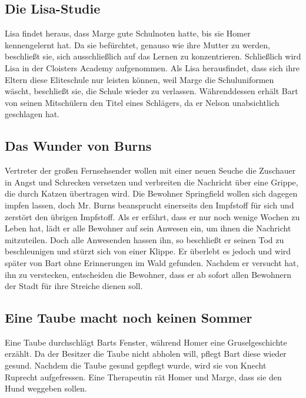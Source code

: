 \subsection{Die Lisa-Studie}
Lisa findet heraus, dass Marge gute Schulnoten hatte, bis sie Homer kennengelernt hat. Da sie befürchtet, genauso wie ihre Mutter zu werden, beschließt sie, sich ausschließlich auf das Lernen zu konzentrieren. Schließlich wird Lisa in der Cloisters Academy aufgenommen. Als Lisa herausfindet, dass sich ihre Eltern diese Eliteschule nur leisten können, weil Marge die Schuluniformen wäscht, beschließt sie, die Schule wieder zu verlassen. Währenddessen erhält Bart von seinen Mitschülern den Titel eines Schlägers, da er Nelson unabsichtlich geschlagen hat.


\subsection{Das Wunder von Burns}\label{NABF01}
Vertreter der großen Fernsehsender wollen mit einer neuen Seuche die Zuschauer in Angst und Schrecken versetzen und verbreiten die Nachricht über eine Grippe, die durch Katzen übertragen wird. Die Bewohner Springfield wollen sich dagegen impfen lassen, doch Mr. Burns beansprucht einerseits den Impfstoff für sich und zerstört den übrigen Impfstoff. Als er erfährt, dass er nur noch wenige Wochen zu Leben hat, lädt er alle Bewohner auf sein Anwesen ein, um ihnen die Nachricht mitzuteilen. Doch alle Anwesenden hassen ihn, so beschließt er seinen Tod zu beschleunigen und stürzt sich von einer Klippe. Er überlebt es jedoch und wird später von Bart ohne Erinnerungen im Wald gefunden. Nachdem er versucht hat, ihn zu verstecken, entscheiden die Bewohner, dass er ab sofort allen Bewohnern der Stadt für ihre Streiche dienen soll. 


\subsection{Eine Taube macht noch keinen Sommer}\label{NABF02}
Eine Taube durchschlägt Barts Fenster, während Homer eine Gruselgeschichte erzählt. Da der Besitzer die Taube nicht abholen will, pflegt Bart diese wieder gesund. Nachdem die Taube gesund gepflegt wurde, wird sie von Knecht Ruprecht aufgefressen. Eine Therapeutin rät Homer und Marge, dass sie den Hund weggeben sollen.

